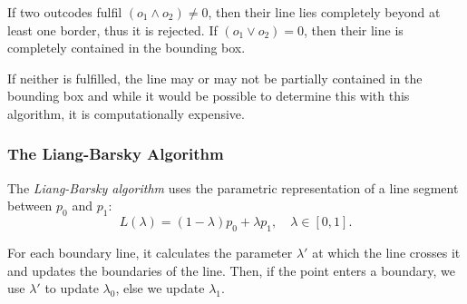 \documentclass{panikzettel}
\begin{document}
If two outcodes fulfil $(o_1 \land o_2) \neq 0$, then their line lies completely beyond at least one border, thus it is rejected. If $(o_1 \lor o_2) = 0$, then their line is completely contained in the bounding box.

If neither is fulfilled, the line may or may not be partially contained in the bounding box and while it would be possible to determine this with this algorithm, it is computationally expensive.

\subsubsection*{The Liang-Barsky Algorithm}

\begin{halfboxl}
The \emph{Liang-Barsky algorithm} uses the parametric representation of a line segment between $p_0$ and $p_1$: $$L(\lambda) = (1 - \lambda)p_0 + \lambda p_1, \quad \lambda \in [0,1].$$

For each boundary line, it calculates the parameter $\lambda'$ at which the line crosses it and updates the boundaries of the line. Then, if the point enters a boundary, we use $\lambda'$ to update $\lambda_0$, else we update $\lambda_1$.
\end{halfboxl}%
\begin{halfboxr}
\vspace{-\baselineskip}
\begin{center}
\end{center}
\end{halfboxr}
\end{document}
